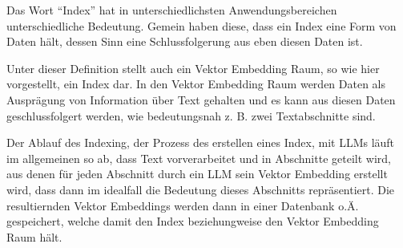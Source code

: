 \documentclass[../main.tex]{subfiles}
\begin{document}
Das Wort \enquote{Index} hat in unterschiedlichsten Anwendungsbereichen unterschiedliche Bedeutung.
Gemein haben diese, dass ein Index eine Form von Daten hält, dessen Sinn eine Schlussfolgerung aus eben diesen Daten ist.
\cite{Chatterjee2017Index,Lo2016What,Vickery1950THE}

Unter dieser Definition stellt auch ein Vektor Embedding Raum, so wie hier vorgestellt, ein Index dar.
In den Vektor Embedding Raum werden Daten als Ausprägung von Information über Text gehalten und es kann aus diesen Daten geschlussfolgert werden, wie bedeutungsnah z. B. zwei Textabschnitte sind.

Der Ablauf des Indexing, der Prozess des erstellen eines Index, mit \glspl{LLM} läuft im allgemeinen so ab, dass Text vorverarbeitet und in Abschnitte geteilt wird, aus denen für jeden Abschnitt durch ein \gls{LLM} sein Vektor Embedding erstellt wird, dass dann im idealfall die Bedeutung dieses Abschnitts repräsentiert.
Die resultiernden Vektor Embeddings werden dann in einer Datenbank o.Ä. gespeichert, welche damit den Index beziehungweise den Vektor Embedding Raum hält.
\cite{ji2022speeding}
\end{document}
